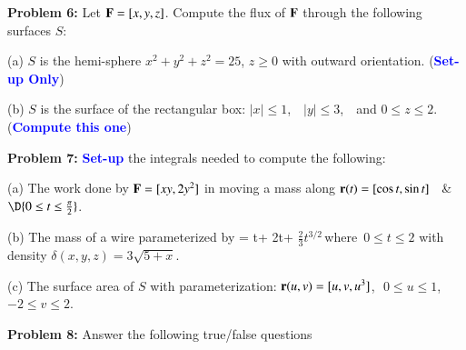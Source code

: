 \documentclass[11pt]{article}
\begin{document}
{\bf Problem 6:} Let $\text{\bf F} = [x,y,z]$.   Compute the flux of $\text{\bf F}$ through the following surfaces $S$:

(a) $S$ is the hemi-sphere $x^2+y^2+z^2 = 25$, $z \ge 0$ with outward orientation. (\textcolor{blue}{\bf Set-up Only})

\vspace{0.1cm}

(b) $S$ is the surface of the rectangular box: $|x| \le 1$, \,\, $|y| \le 3$, \,\, and $0 \le z \le 2$. (\textcolor{blue}{\bf Compute this one})

\vspace{0.2cm}

{\bf Problem 7:} \textcolor{blue}{\bf Set-up} the integrals needed to compute the following:

(a) The work done by $\text{\bf F} = [xy,2y^2]$ in moving a mass along $\text{\bf r}(t) = [\cos t, \sin t]$ \, \& \, $\D{0 \le t \le \frac{\pi}{2}}$.
	
(b) The mass of a wire parameterized by \RT = t\VI + 2t\VJ + $\frac{2}{3}t^{3/2}$\VK \,where\, $0 \le t \le 2$ with density $\delta(x,y,z) = 3\sqrt{5+x}$.

\vspace{0.01cm}

(c) The surface area of $S$ with parameterization: ${\bf r}(u,v) = [u,v,u^3]$,\,\, $0 \le u \le 1$,\,\, $-2 \le v \le 2$.

{\bf Problem 8:} Answer the following true/false questions

\vspace{0.1cm}
\end{document}
